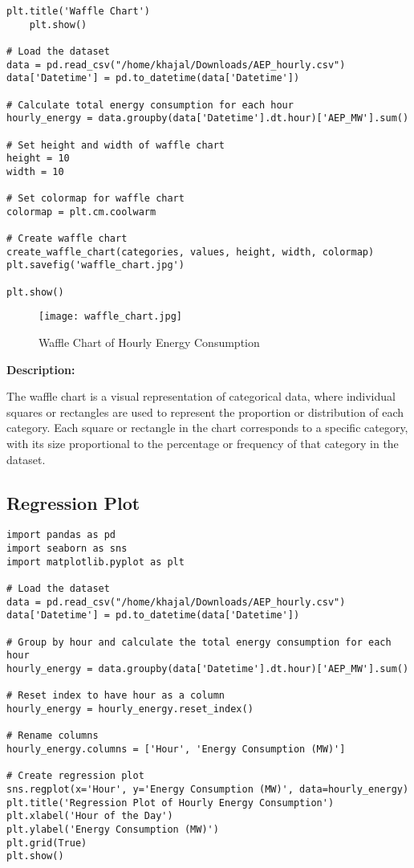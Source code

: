 \documentclass{article}
\begin{document}
\begin{lstlisting}[caption={Python code for Waffle Chart}]
    plt.title('Waffle Chart')
    plt.show()

# Load the dataset
data = pd.read_csv("/home/khajal/Downloads/AEP_hourly.csv")
data['Datetime'] = pd.to_datetime(data['Datetime'])

# Calculate total energy consumption for each hour
hourly_energy = data.groupby(data['Datetime'].dt.hour)['AEP_MW'].sum()

# Set height and width of waffle chart
height = 10
width = 10

# Set colormap for waffle chart
colormap = plt.cm.coolwarm

# Create waffle chart
create_waffle_chart(categories, values, height, width, colormap)
plt.savefig('waffle_chart.jpg')

plt.show()

\end{lstlisting}

\begin{figure}[H]
    \centering
    \texttt{[image: waffle\_chart.jpg]}
    \caption{Waffle Chart of Hourly Energy Consumption}
    \label{waffle chart}
\end{figure}
\textbf{Description:}

The waffle chart is a visual representation of categorical data, where individual squares or rectangles are used to represent the proportion or distribution of each category. Each square or rectangle in the chart corresponds to a specific category, with its size proportional to the percentage or frequency of that category in the dataset.
\subsection{ Regression Plot}
\begin{lstlisting}[caption={python code for regression plot}]
import pandas as pd
import seaborn as sns
import matplotlib.pyplot as plt

# Load the dataset
data = pd.read_csv("/home/khajal/Downloads/AEP_hourly.csv")
data['Datetime'] = pd.to_datetime(data['Datetime'])

# Group by hour and calculate the total energy consumption for each hour
hourly_energy = data.groupby(data['Datetime'].dt.hour)['AEP_MW'].sum()

# Reset index to have hour as a column
hourly_energy = hourly_energy.reset_index()

# Rename columns
hourly_energy.columns = ['Hour', 'Energy Consumption (MW)']

# Create regression plot
sns.regplot(x='Hour', y='Energy Consumption (MW)', data=hourly_energy)
plt.title('Regression Plot of Hourly Energy Consumption')
plt.xlabel('Hour of the Day')
plt.ylabel('Energy Consumption (MW)')
plt.grid(True)
plt.show()
\end{lstlisting}
\end{document}
